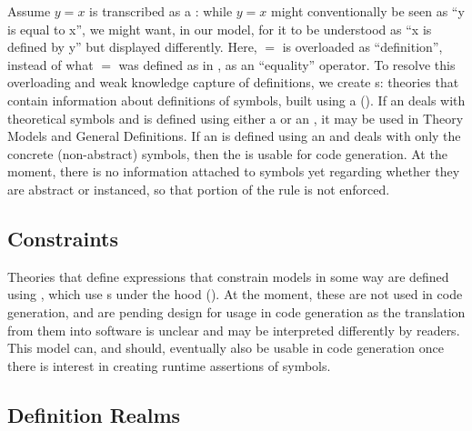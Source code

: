 \currentQDefinitionHaskell{}

Assume \(y = x\) is transcribed as a \RelationConcept{}: while \(y = x\) might
conventionally be seen as ``y is equal to x'', we might want, in our model, for
it to be understood as ``x is defined by y'' but displayed differently. Here,
\(=\) is overloaded as ``definition'', instead of what \(=\) was defined as in
\Expr{}, as an ``equality'' operator. To resolve this overloading and weak
knowledge capture of definitions, we create \EquationalModel{}s: theories that
contain information about definitions of symbols, built using a \QDefinition{}
(). If an \EquationalModel{} deals with
theoretical symbols and is defined using either a \ModelExpr{} or an \Expr{}, it
may be used in Theory Models and General Definitions. If an \EquationalModel{}
is defined using an \Expr{} and deals with only the concrete (non-abstract)
symbols, then the \EquationalModel{} is usable for code generation. At the
moment, there is no information attached to symbols yet regarding whether they
are abstract or instanced, so that portion of the rule is not enforced.


\subsection{Constraints}

\currentConstraintSetHaskell{}

Theories that define expressions that constrain models in some way are defined
using \EquationalConstraints{}, which use \ConstraintSet{}s under the hood
(). At the moment, these are not used in code generation, and are pending
design for usage in code generation as the translation from them into software
is unclear and may be interpreted differently by readers. This model can, and
should, eventually also be usable in code generation once there is interest in
creating runtime assertions of symbols.


\subsection{Definition Realms}

